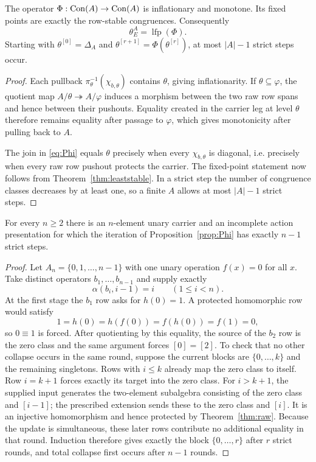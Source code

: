 \begin{proposition}\label{prop:Phi}
The operator $\Phi:\operatorname{Con}(A)\to\operatorname{Con}(A)$ is inflationary and monotone.  Its fixed points are exactly the row-stable congruences.  Consequently
\begin{equation}\label{eq:lfp}
\boxed{\theta_E^A=\operatorname{lfp}(\Phi).}
\end{equation}
Starting with $\theta^{[0]}=\Delta_A$ and $\theta^{[r+1]}=\Phi(\theta^{[r]})$, at most $|A|-1$ strict steps occur.
\end{proposition}

\begin{proof}
Each pullback $\pi_\theta^{-1}(\chi_{b,\theta})$ contains $\theta$, giving inflationarity.  If $\theta\subseteq\varphi$, the quotient map $A/\theta\twoheadrightarrow A/\varphi$ induces a morphism between the two raw row spans and hence between their pushouts.  Equality created in the carrier leg at level $\theta$ therefore remains equality after passage to $\varphi$, which gives monotonicity after pulling back to $A$.

The join in \eqref{eq:Phi} equals $\theta$ precisely when every $\chi_{b,\theta}$ is diagonal, i.e. precisely when every raw row pushout protects the carrier.  The fixed-point statement now follows from Theorem~\ref{thm:leaststable}.  In a strict step the number of congruence classes decreases by at least one, so a finite $A$ allows at most $|A|-1$ strict steps.
\end{proof}

\begin{proposition}\label{prop:sharpfeedback}
For every $n\ge2$ there is an $n$-element unary carrier and an incomplete action presentation for which the iteration of Proposition~\ref{prop:Phi} has exactly $n-1$ strict steps.
\end{proposition}

\begin{proof}
Let $A_n=\{0,1,\ldots,n-1\}$ with one unary operation $f(x)=0$ for all $x$.  Take distinct operators $b_1,\ldots,b_{n-1}$ and supply exactly
\[
\alpha(b_i,i-1)=i
\qquad(1\le i<n).
\]
At the first stage the $b_1$ row asks for $h(0)=1$.  A protected homomorphic row would satisfy
\[
1=h(0)=h(f(0))=f(h(0))=f(1)=0,
\]
so $0\equiv1$ is forced.  After quotienting by this equality, the source of the $b_2$ row is the zero class and the same argument forces $[0]=[2]$.  To check that no other collapse occurs in the same round, suppose the
current blocks are $\{0,\ldots,k\}$ and the remaining singletons. Rows with
$i\le k$ already map the zero class to itself. Row $i=k+1$ forces exactly
its target into the zero class. For $i>k+1$, the supplied input generates
the two-element subalgebra consisting of the zero class and $[i-1]$;
the prescribed extension sends these to the zero class and $[i]$.
It is an injective homomorphism and hence protected by
Theorem~\ref{thm:raw}. Because the update is simultaneous, these later rows
contribute no additional equality in that round. Induction therefore gives
exactly the block $\{0,\ldots,r\}$ after $r$ strict rounds, and total
collapse first occurs after $n-1$ rounds.
\end{proof}

